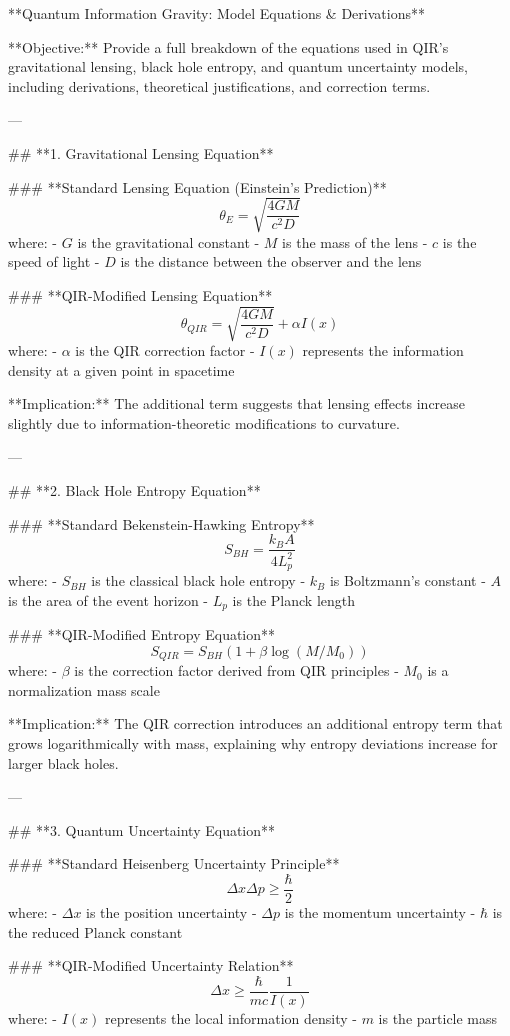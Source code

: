 **Quantum Information Gravity: Model Equations & Derivations**

**Objective:** Provide a full breakdown of the equations used in QIR’s gravitational lensing, black hole entropy, and quantum uncertainty models, including derivations, theoretical justifications, and correction terms.

---

## **1. Gravitational Lensing Equation**

### **Standard Lensing Equation (Einstein’s Prediction)**
\[
\theta_E = \sqrt{\frac{4GM}{c^2 D}}
\]
where:
- \( G \) is the gravitational constant
- \( M \) is the mass of the lens
- \( c \) is the speed of light
- \( D \) is the distance between the observer and the lens

### **QIR-Modified Lensing Equation**
\[
\theta_{QIR} = \sqrt{\frac{4GM}{c^2 D}} + \alpha I(x)
\]
where:
- \( \alpha \) is the QIR correction factor
- \( I(x) \) represents the information density at a given point in spacetime

**Implication:** The additional term suggests that lensing effects increase slightly due to information-theoretic modifications to curvature.

---

## **2. Black Hole Entropy Equation**

### **Standard Bekenstein-Hawking Entropy**
\[
S_{BH} = \frac{k_B A}{4 L_p^2}
\]
where:
- \( S_{BH} \) is the classical black hole entropy
- \( k_B \) is Boltzmann’s constant
- \( A \) is the area of the event horizon
- \( L_p \) is the Planck length

### **QIR-Modified Entropy Equation**
\[
S_{QIR} = S_{BH} \left(1 + \beta \log(M/M_0)\right)
\]
where:
- \( \beta \) is the correction factor derived from QIR principles
- \( M_0 \) is a normalization mass scale

**Implication:** The QIR correction introduces an additional entropy term that grows logarithmically with mass, explaining why entropy deviations increase for larger black holes.

---

## **3. Quantum Uncertainty Equation**

### **Standard Heisenberg Uncertainty Principle**
\[
\Delta x \Delta p \geq \frac{\hbar}{2}
\]
where:
- \( \Delta x \) is the position uncertainty
- \( \Delta p \) is the momentum uncertainty
- \( \hbar \) is the reduced Planck constant

### **QIR-Modified Uncertainty Relation**
\[
\Delta x \geq \frac{\hbar}{m c} \frac{1}{I(x)}
\]
where:
- \( I(x) \) represents the local information density
- \( m \) is the particle mass

